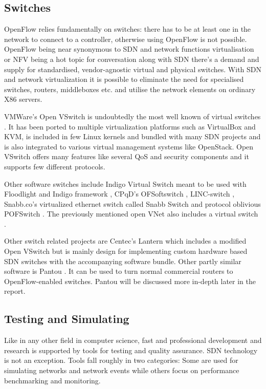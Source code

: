 \clearpage
\subsection{Switches}

OpenFlow relies fundamentally on switches: there has to be at least one in the network to connect to a controller, otherwise using OpenFlow is not possible. OpenFlow being near synonymous to SDN and network functions virtualisation or NFV being a hot topic for conversation along with SDN there’s a demand and supply for standardised, vendor-agnostic virtual and physical switches. With SDN and network virtualization it is possible to eliminate the need for specialised switches, routers, middleboxes etc. and utilise the network elements on ordinary X86 servers.

VMWare’s Open VSwitch is undoubtedly the most well known of virtual switches \cite{VSwitch}. It has been ported to multiple virtualization platforms such as VirtualBox
and KVM, is included in few Linux kernels and bundled with many SDN projects and is also integrated to various virtual management systems like OpenStack. Open VSwitch offers many features like several QoS and security components and it supports few different protocols.

Other software switches include Indigo Virtual Switch meant to be used with Floodlight and Indigo framework \cite{IndigoSwitch}, CPqD’s OFSoftswitch \cite{OfSwitch}, LINC-switch \cite{LINC}, Snabb.co’s virtualized ethernet switch called Snabb Switch \cite{Snabb} and protocol oblivious POFSwitch \cite{POFSwitch}. The previously mentioned open VNet also includes a virtual switch \cite{VNet}. 

Other switch related projects are Centec’s Lantern \cite{Lantern} which includes a modified Open VSwitch but is mainly design for implementing custom  hardware based SDN switches with the accompanying software bundle. Other partly similar software is Pantou \cite{Yia04}. It can be used to turn normal commercial routers to OpenFlow-enabled switches. Pantou will be discussed more in-depth later in the report.

\subsection{Testing and Simulating}

Like in any other field in computer science, fast and professional development and research is supported by tools for testing and quality assurance. SDN technology is not an exception. Tools fall roughly in two categories: Some are used for simulating networks and network events while others focus on performance benchmarking and monitoring.

